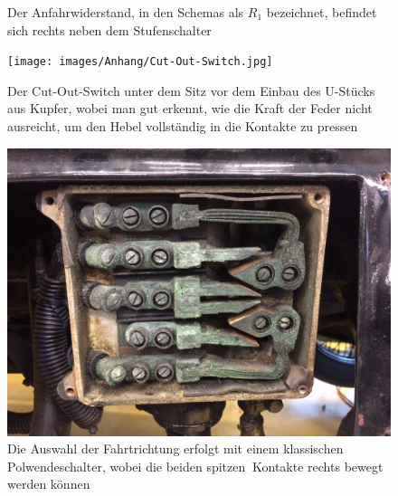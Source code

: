 \begin{landscape}
\begin{figure}[h]
	\caption{Der Anfahrwiderstand, in den Schemas als $R_1$ bezeichnet, befindet sich rechts neben dem Stufenschalter}
	\label{fig:Anfahrwiderstand}
\end{figure}
\begin{figure}[h]
	\centering
		\texttt{[image: images/Anhang/Cut-Out-Switch.jpg]}
	\caption{Der Cut-Out-Switch unter dem Sitz vor dem Einbau des U-Stücks aus Kupfer, wobei man gut erkennt, wie die Kraft der Feder nicht ausreicht, um den Hebel vollständig in die Kontakte zu pressen}
	\label{fig:Cut-Out-Switch}
\end{figure}
\begin{figure}[h]
	\centering
		\includegraphics[width=1.30\textwidth]{images/Anhang/Fahrtrichtung.jpg}
	\caption{Die Auswahl der Fahrtrichtung erfolgt mit einem klassischen Polwendeschalter, wobei die beiden \grqq spitzen\grqq$~$ Kontakte rechts bewegt werden können}
	\label{fig:Fahrtrichtung}
\end{figure}
\begin{figure}[h]
	\centering

\end{figure}
\end{landscape}
